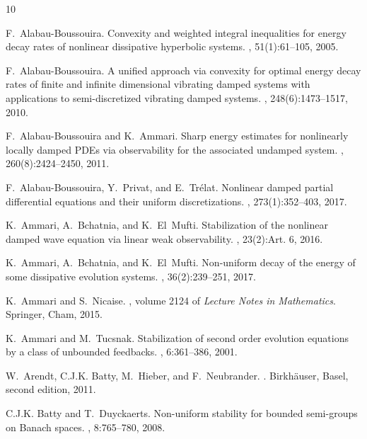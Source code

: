 \documentclass[11pt, a4paper]{amsart}
\theoremstyle{definition}
\numberwithin{equation}{section}
\begin{document}

\begin{thebibliography}{10}

F.~Alabau-Boussouira.
\newblock Convexity and weighted integral inequalities for energy decay rates
  of nonlinear dissipative hyperbolic systems.
, 51(1):61--105, 2005.

F.~Alabau-Boussouira.
\newblock A unified approach via convexity for optimal energy decay rates of
  finite and infinite dimensional vibrating damped systems with applications to
  semi-discretized vibrating damped systems.
, 248(6):1473--1517, 2010.

F.~Alabau-Boussouira and K.~Ammari.
\newblock Sharp energy estimates for nonlinearly locally damped {PDE}s via
  observability for the associated undamped system.
, 260(8):2424--2450, 2011.

F.~Alabau-Boussouira, Y.~Privat, and E.~Tr\'{e}lat.
\newblock Nonlinear damped partial differential equations and their uniform
  discretizations.
, 273(1):352--403, 2017.

K.~Ammari, A.~Bchatnia, and K.~El~Mufti.
\newblock Stabilization of the nonlinear damped wave equation via linear weak
  observability.
, 23(2):Art. 6, 2016.

K.~Ammari, A.~Bchatnia, and K.~El~Mufti.
\newblock Non-uniform decay of the energy of some dissipative evolution
  systems.
, 36(2):239--251, 2017.

K.~Ammari and S.~Nicaise.
, volume
  2124 of {\em Lecture Notes in Mathematics}.
\newblock Springer, Cham, 2015.

K.~Ammari and M.~Tucsnak.
\newblock Stabilization of second order evolution equations by a class of
  unbounded feedbacks.
, 6:361--386, 2001.

W.~Arendt, C.J.K. Batty, M.~Hieber, and F.~Neubrander.
.
\newblock Birkh{\"a}user, Basel, second edition, 2011.

C.J.K. Batty and T.~Duyckaerts.
\newblock Non-uniform stability for bounded semi-groups on {B}anach spaces.
, 8:765--780, 2008.


\end{thebibliography}
\end{document}
